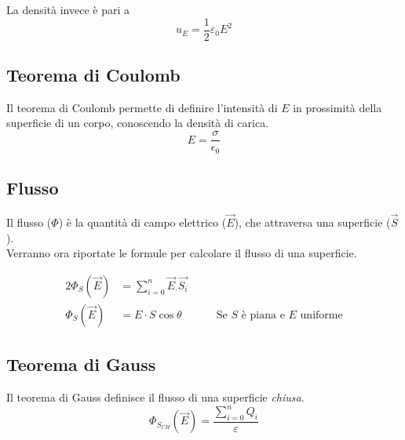 La densità invece è pari a
\begin{equation*}
  u_E = \frac{1}{2}\varepsilon_0E^2
\end{equation*}

\subsection{Teorema di Coulomb}
Il teorema di Coulomb permette di definire l'intensità di $E$ in prossimità della superficie di un
corpo, conoscendo la densità di carica.
\begin{equation*}
  E = \frac{\sigma}{\epsilon_0}
\end{equation*}

\subsection{Flusso} \label{subsec:flusso}
Il flusso ($\Phi$) è la quantità di campo elettrico ($\vec{E}$), che 
attraversa una superficie ($\vec{S}$).\\
Verranno ora riportate le formule per calcolare il flusso di una superficie.

\begin{alignat*}{2}
  \Phi_S\left(\vec{E}\right) &= \sum\limits_{i=0}^{n}\vec{E}_\cdot\vec{S_i} &\quad &\\
  \Phi_S\left(\vec{E}\right) &= E\cdot S\cos\theta & &\text{Se } S \text{ è piana e } E \text{ 
  uniforme} 
\end{alignat*}
\begin{center}
\end{center}

\subsection{Teorema di Gauss}
Il teorema di Gauss definisce il flusso di una superficie \emph{chiusa}.
\begin{equation*}
  \Phi_{S_{CH}}\left(\vec{E}\right) = \frac{\sum\limits_{i=0}^{n}Q_i}{\varepsilon}
\end{equation*}

